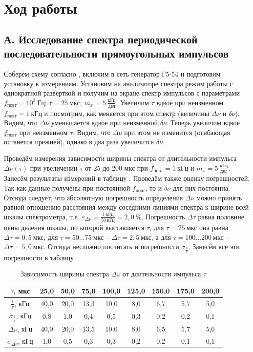\documentclass[a4paper,10pt]{article}
\begin{document}
\section*{Ход работы}

\subsection*{А. Исследование спектра периодической последовательности прямоугольных импульсов}

Соберём схему согласно , включим в сеть генератор Г5-54 и подготовим установку к измерениям. Установим на анализаторе спектра режим работы с однократной развёрткой и получим на экране спектр импульсов с параметрами $f_{повт}=10^3~\text{Гц}$; $\tau=25~\text{мкс}$; $m_x=5~\frac{\text{кГц}}{\text{дел}}$. Увеличим $\tau$ вдвое при неизменном $f_{повт}=1~\text{кГц}$ и посмотрим, как меняется при этом спектр (величины $\Delta\nu$ и $\delta\nu$). Видим, что $\Delta\nu$ уменьшается вдвое при неизменной $\delta\nu$. Теперь увеличим вдвое $f_{повт}$ при неизменном $\tau$. Видим, что $\Delta\nu$ при этом не изменится (огибающая останется прежней), однако в два раза увеличится $\delta\nu$.

Проведём измерения зависимости ширины спектра от длительности импульса $\Delta\nu\left(\tau\right)$ при увеличении $\tau$ от 25 до 200 мкс при $f_{повт}=1~\text{кГц}$ и $m_x=5~\frac{\text{кГц}}{\text{дел}}$. Занесём результаты измерений в таблицу . Проведём также оценку погрешностей. Так как данные получены при постоянной $f_{повт}$, то и $\delta\nu$ для них постоянна. Отсюда следует, что абсолютную погрешность определения $\Delta\nu$ можно принять равной отношению расстояния между соседними линиями спектра к ширине всей шкалы спектрометра, т.е. $\varepsilon_{\Delta\nu}=\frac{1~\text{кГц}}{50~\text{кГц}}=2,0~\%$. Погрешность $\Delta\tau$ равна половине цены деления шкалы, по которой выставляется $\tau$, для $\tau=25~\text{мкс}$ она равна $\Delta\tau=0,5~\text{мкс}$, для $\tau=50\ldots75~\text{мкс}$ -- $\Delta\tau=2,5~\text{мкс}$, а для $\tau=100\ldots200~\text{мкс}$ -- $\Delta\tau=5,0~\text{мкс}$. Отсюда несложно посчитать и погрешности $\sigma_{\frac{1}{\tau}}$. Занесём все эти погрешности в таблицу .

\begin{table}[h]
	\centering
	\caption{Зависимость ширины спектра $\Delta\nu$ от длительности импульса $\tau$} \label{Table_A}
	\begin{tabular}{|c|c|c|c|c|c|c|c|c|}
		\hline
		$\tau$, мкс & 25,0 & 50,0 & 75,0 & 100,0 & 125,0 & 150,0 & 175,0 & 200,0 \\ \hline
		$\frac{1}{\tau}$, кГц & 40,0 & 20,0 & 13,3 & 10,0 & 8,0 & 6,7 & 5,7 & 5,0 \\ \hline
		$\sigma_{\frac{1}{\tau}}$, кГц & 0,8 & 1,0 & 0,4 & 0,5 & 0,3 & 0,2 & 0,2 & 0,1 \\ \hline
		$\Delta\nu$, кГц & 40,0 & 20,0 & 13,5 & 10,0 & 8,0 & 6,5 & 5,7 & 5,0 \\ \hline
		$\sigma_{\Delta\nu}$, кГц & 1,0 & 0,5 & 0,3 & 0,3 & 0,2 & 0,2 & 0,1 & 0,1 \\ \hline
	\end{tabular}
\end{table}
\end{document}

